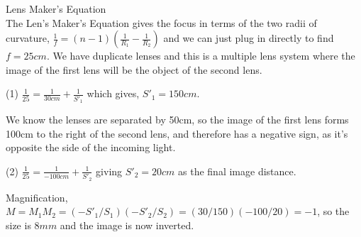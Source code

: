 \documentclass[10pt]{article}
\newenvironment{problem}[2][Problem]{\begin{trivlist}
\item[\hskip \labelsep {\bfseries #1}\hskip \labelsep {\bfseries #2.}]}{\end{trivlist}}
\begin{document}
\begin{problem}{8} Lens Maker's Equation\\
The Len's Maker's Equation gives the focus in terms of the two radii of curvature, $\frac{1}{f} = (n-1) \left(\frac{1}{R_1} - \frac{1}{R_2}\right)$ and we can just plug in directly to find $f=25cm$. We have duplicate lenses and this is a multiple lens system where the image of the first lens will be the object of the second lens.
\item (1) $\frac{1}{25}=\frac{1}{30cm}+\frac{1}{S'_1}$ which gives, $S'_1=150cm$.
\item We know the lenses are separated by 50cm, so the image of the first lens forms 100cm to the right of the second lens, and therefore has a negative sign, as it's opposite the side of the incoming light.
\item (2) $\frac{1}{25}=\frac{1}{-100cm}+\frac{1}{S'_2}$ giving $S'_2=20cm$ as the final image distance.
\item Magnification, $M=M_1M_2=(-S'_1/S_1)(-S'_2/S_2)=(30/150)(-100/20)=-1$, so the size is $8mm$ and the image is now inverted.
\end{problem}










\end{document}
